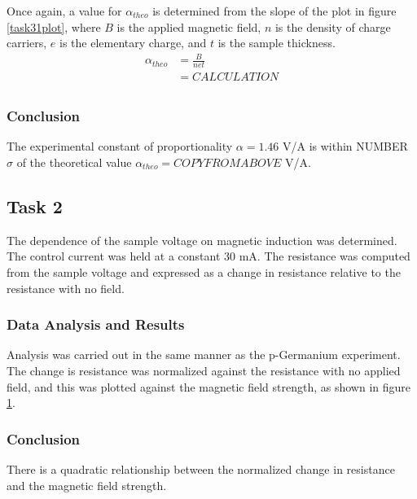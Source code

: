 \documentclass[a4paper]{article}
\begin{document}
Once again, a value for $\alpha_{theo}$ is determined from the slope of the plot in figure \ref{task31plot}, where $B$ is the applied magnetic field, $n$ is the density of charge carriers, $e$ is the elementary charge, and $t$ is the sample thickness.
\begin{align*}
\alpha_{theo} &= \frac{B}{net} \\
			  &= CALCULATION \\
\end{align*}

\subsubsection{Conclusion}
The experimental constant of proportionality $\alpha = 1.46 $ V/A is within NUMBER $\sigma$ of the theoretical value $\alpha_{theo} = COPYFROMABOVE$ V/A.

\subsection{Task 2}

\qq The dependence of the sample voltage on magnetic induction was determined. The control current was held at a constant
30 mA. The resistance was computed from the sample voltage and expressed as a change in resistance relative to the resistance with no field.

\subsubsection{Data Analysis and Results}
Analysis was carried out in the same manner as the p-Germanium experiment. The change is resistance was normalized against the resistance with no applied field, and this was plotted against the magnetic field strength, as shown in figure \ref{task32plot}.

\begin{figure}[H]
\centering
\label{task32plot}
\end{figure}


\subsubsection{Conclusion}
There is a quadratic relationship between the normalized change in resistance and the magnetic field strength.
\end{document}
